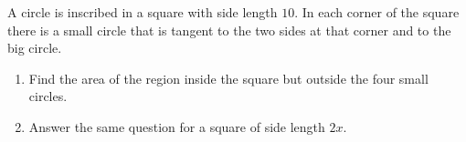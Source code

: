 A circle is inscribed in a square with side length $10$. In each corner of the square there is a small circle that is tangent to the two sides at that corner and to the big circle.
\begin{enumerate}
\item[(a)] Find the area of the region inside the square but outside the four small circles.
\item[(b)] Answer the same question for a square of side length $2x$.
\end{enumerate}
